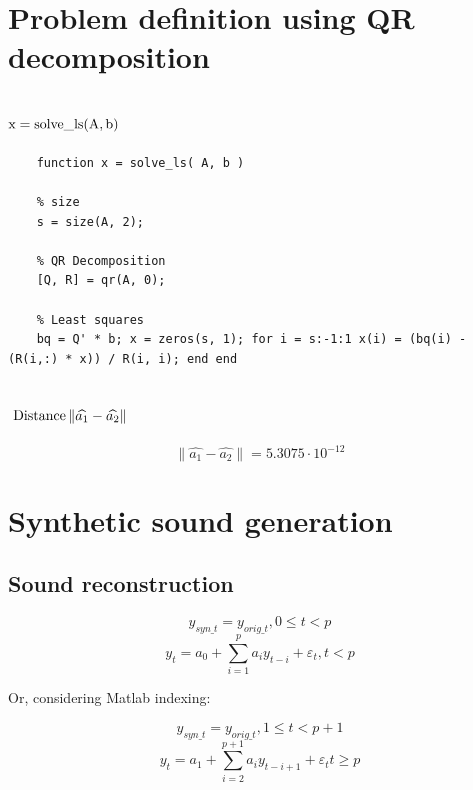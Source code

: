 \documentclass[a4paper]{article}
\begin{document}
\section{Problem definition using QR decomposition} 
\subsection{$\textup{x}=\textup{solve}\_\textup{ls}(\textup{A},\textup{b})$}
\begin{verbatim}
	function x = solve_ls( A, b )
	
	% size
	s = size(A, 2);
	
	% QR Decomposition
	[Q, R] = qr(A, 0); 
	
	% Least squares
	bq = Q' * b; x = zeros(s, 1); for i = s:-1:1 x(i) = (bq(i) - (R(i,:) * x)) / R(i, i); end end 
\end{verbatim}
\subsection{ $\textup{ Distance} \left \| \widehat{a_{1}} -\widehat{a_{2}} \right \| $}
\[\left \| \widehat{a_{1}} -\widehat{a_{2}} \right \| = 5.3075\cdot 10^{-12}\]

\section{Synthetic sound generation} 
\subsection{Sound reconstruction}

\[y_{syn\_t} = y_{orig\_t}, 0 \leq t < p\]
\[y_{t} = a_{0} + \sum_{i=1}^{p} a_{i}y_{t-i}+\varepsilon_{t}, t < p\]

%
Or, considering Matlab indexing: 

%
\[y_{syn\_t} = y_{orig\_t}, 1 \leq t < p+1\]
\[y_{t} = a_{1} + \sum_{i=2}^{p+1} a_{i}y_{t-i+1}+\varepsilon_{t} t\geq p\]
\end{document}
